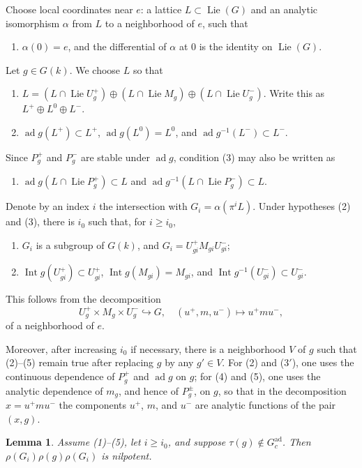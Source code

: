 \documentclass[11pt]{amsart}
\theoremstyle{plain}
\newtheorem*{lemma*}{Lemma}
\theoremstyle{definition}
\theoremstyle{remark}
\DeclareMathOperator{\Lie}{Lie}
\DeclareMathOperator{\ad}{ad}
\DeclareMathOperator{\Int}{Int}
\begin{document}
Choose local coordinates near $e$: a lattice $L\subset\Lie(G)$ and an analytic isomorphism $\alpha$ from $L$ to a neighborhood of $e$, such that
\begin{enumerate}
\item[(1)] $\alpha(0)=e$, and the differential of $\alpha$ at $0$ is the identity on $\Lie(G)$.
\end{enumerate}
Let $g\in G(k)$. We choose $L$ so that
\begin{enumerate}
\item[(2)] $L=(L\cap\Lie U_g^+)\oplus(L\cap\Lie M_g)\oplus(L\cap\Lie U_g^-)$. Write this as $L^+\oplus L^0\oplus L^-$.
\item[(3)] $\ad g(L^+)\subset L^+$, $\ad g(L^0)=L^0$, and $\ad g^{-1}(L^-)\subset L^-$.
\end{enumerate}
Since $P_g^+$ and $P_g^-$ are stable under $\ad g$, condition (3) may also be written as
\begin{enumerate}
\item[(3$'$)] $\ad g(L\cap\Lie P_g^+)\subset L$ and $\ad g^{-1}(L\cap\Lie P_g^-)\subset L$.
\end{enumerate}
Denote by an index $i$ the intersection with $G_i=\alpha(\pi^iL)$. Under hypotheses (2) and (3), there is $i_0$ such that, for $i\ge i_0$,
\begin{enumerate}
\item[(4)] $G_i$ is a subgroup of $G(k)$, and $G_i=U_{gi}^+M_{gi}U_{gi}^-$;
\item[(5)] $\Int g(U_{gi}^+)\subset U_{gi}^+$, $\Int g(M_{gi})=M_{gi}$, and $\Int g^{-1}(U_{gi}^-)\subset U_{gi}^-$.
\end{enumerate}
This follows from the decomposition
\[
U_g^+\times M_g\times U_g^-\hookrightarrow G,
\quad (u^+,m,u^-)\mapsto u^+mu^-,
\]
of a neighborhood of $e$.

Moreover, after increasing $i_0$ if necessary, there is a neighborhood $V$ of $g$ such that (2)--(5) remain true after replacing $g$ by any $g'\in V$. For (2) and (3$'$), one uses the continuous dependence of $P_g^+$ and $\ad g$ on $g$; for (4) and (5), one uses the analytic dependence of $m_g$, and hence of $P_g^\pm$, on $g$, so that in the decomposition $x=u^+mu^-$ the components $u^+$, $m$, and $u^-$ are analytic functions of the pair $(x,g)$.

\begin{lemma*}
Assume (1)--(5), let $i\ge i_0$, and suppose $\tau(g)\notin G_c^{\mathrm{ad}}$. Then $\rho(G_i)\rho(g)\rho(G_i)$ is nilpotent.
\end{lemma*}
\end{document}
